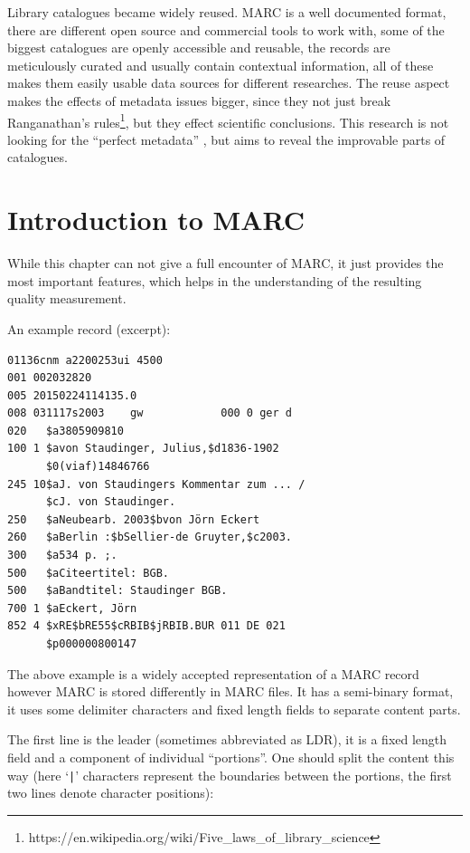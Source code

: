 Library catalogues became widely reused. MARC is a well documented format, there are different open source and commercial tools to work with, some of the biggest catalogues are openly accessible and reusable, the records are meticulously curated and usually contain contextual information, all of these makes them easily usable data sources for different researches. The reuse aspect makes the effects of metadata issues bigger, since they not just break Ranganathan's rules\footnote{https://en.wikipedia.org/wiki/Five\_laws\_of\_library\_science}, but they effect scientific conclusions. This research is not looking for the ``perfect metadata'' \cite{bade2008}, but aims to reveal the improvable parts of catalogues.

\section{Introduction to MARC}

While this chapter can not give a full encounter of MARC, it just provides the most important features, which helps in the understanding of the resulting quality measurement. 

An example record (excerpt):

\begin{small}
\begin{Verbatim}[samepage=true]
01136cnm a2200253ui 4500
001 002032820
005 20150224114135.0
008 031117s2003    gw            000 0 ger d
020   $a3805909810
100 1 $avon Staudinger, Julius,$d1836-1902
      $0(viaf)14846766
245 10$aJ. von Staudingers Kommentar zum ... /
      $cJ. von Staudinger.
250   $aNeubearb. 2003$bvon Jörn Eckert
260   $aBerlin :$bSellier-de Gruyter,$c2003.
300   $a534 p. ;.
500   $aCiteertitel: BGB.
500   $aBandtitel: Staudinger BGB.
700 1 $aEckert, Jörn
852 4 $xRE$bRE55$cRBIB$jRBIB.BUR 011 DE 021
      $p000000800147
\end{Verbatim}
\end{small}

The above example is a widely accepted representation of a MARC record however MARC is stored differently in MARC files. It has a semi-binary format, it uses some delimiter characters and fixed length fields to separate content parts. 

The first line is the leader (sometimes abbreviated as LDR), it is a fixed length field and a component of individual ``portions''. One should split the content this way (here `\texttt{|}' characters represent the boundaries between the portions, the first two lines denote character positions):

